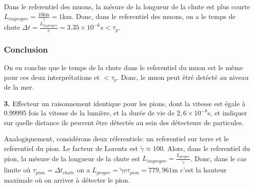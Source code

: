 \documentclass[french]{article}
\begin{document}
	Dans le referentiel des muons, la mésure de la longueur de la chute est plus courte $L_{impropre} = \frac{10 \mathrm{km}}{\gamma} = 1 \mathrm{km}$.	Donc, dans le referentiel des muons, on a le temps de chute $\Delta t = \frac{L_{impropre}}{v} = 3.35 \times 10^{-6}s < \tau_p$.
	
	\subsubsection*{Conclusion}
	
	On en conclue que le temps de la chute dans le referentiel du muon est le même pour ces deux interprétations et $< \tau_p$. Donc, le muon peut êtré detécté au niveau de la mer.

	\begin{tcolorbox}[colback=gray!5!white,colframe=gray!75!black]
		\textbf{3.} Effecteur un raisonnement identique pour les pions, dont la vitesse est égale à $0.99995$ fois la vitesse de la lumière, et la durée de vie de $2,6 \times 10^{-8}$s, et indiquer sur quelle distance ils peuvent être détectés au sein des détecteurs de particules.
	\end{tcolorbox}

	Analogiquement, considérons deux réferentiels: un referentiel sur terre et le referentiel du pion. Le facteur de Lorentz est $\tilde{\gamma} \approx 100$.  Alors, dans le referentiel du pion, la mésure de la longueur de la chute est $L_{impropre} = \frac{L_{propre}}{\tilde{\gamma}}$.	Donc, dans le cas limite où $\tau_{pion} = \Delta t_{chute}$ on a $L_{propre} = \tilde{\gamma}v\tau_{pion} = 779,961\mathrm{m}$ c'est la hauteur maximale où on arriver à détecter le pion.
	
	
\end{document}
